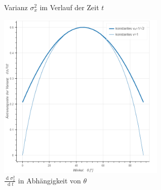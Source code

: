 \documentclass[a4paper,12pt,ngerman]{scrartcl}
\theoremstyle{plain}
\theoremstyle{plain}
\theoremstyle{plain}
\theoremstyle{plain}
\begin{document}
\begin{figure}[H]%
    \centering
    \qquad
    \caption{Varianz $\sigma_x^2$ im Verlauf der Zeit $t$}%
    \label{fig_variance_time}%
\end{figure}

\begin{figure}[H]
\centering
\includegraphics[width=8cm]{varianz-winkel.png}
\caption{$\frac{\operatorname{d}\sigma_x^2}{\operatorname{d}t}$ in Abhängigkeit von $\theta$}
\label{fig_variance_angle}
\end{figure}
\end{document}
